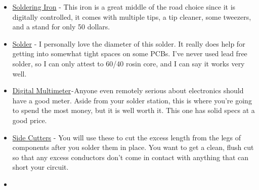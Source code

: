 \documentclass{article}
\begin{document}
\begin{itemize}
	\item \href{https://www.amazon.com/YIHUA-Professional-Digital-Soldering-Station/dp/B07RVMZNYR/ref=sr_1_1_sspa?dchild=1&keywords=soldering+station&qid=1602365482&s=hi&sr=1-1-spons&psc=1&spLa=ZW5jcnlwdGVkUXVhbGlmaWVyPUEzM1c4QjVDR1pQUENZJmVuY3J5cHRlZElkPUEwOTY0MDMwMlVINUhNMEJJTEhWWCZlbmNyeXB0ZWRBZElkPUEwMTM4Mjg4VDVCSzROUENLUDVMJndpZGdldE5hbWU9c3BfYXRmJmFjdGlvbj1jbGlja1JlZGlyZWN0JmRvTm90TG9nQ2xpY2s9dHJ1ZQ==}{Soldering Iron} - This iron is a great middle of the road choice since it is digitally controlled, it comes with multiple tips, a tip cleaner, some tweezers, and a stand for only 50 dollars.
	\item \href{https://www.amazon.com/Rosin-Core-Solder-8-0-oz/dp/B001D8X654/ref=sr_1_2?dchild=1&keywords=60%2F40+rosin+core+solder+.032%22&qid=1602425159&s=hi&sr=1-2}{Solder} - I personally love the diameter of this solder. It really does help for getting into somewhat tight spaces on some PCBs. I've never used lead free solder, so I can only attest to 60/40 rosin core, and I can say it works very well.
	\item \href{https://www.amazon.com/AstroAI-Multimeter-Resistance-Transistors-Temperature/dp/B071JL6LLL/ref=sr_1_1_sspa?crid=2363WGJIIOQRP&dchild=1&keywords=digital+multimeter&qid=1596927870&sprefix=digital+must%2Caps%2C140&sr=8-1-spons&psc=1&spLa=ZW5jcnlwdGVkUXVhbGlmaWVyPUE4N1YxVjBMT05SMEYmZW5jcnlwdGVkSWQ9QTA1ODA5NDkxQjNPTUk2QlFTU0U3JmVuY3J5cHRlZEFkSWQ9QTA4NTc1MjcyQTI1WlBJSkNEUVVZJndpZGdldE5hbWU9c3BfYXRmJmFjdGlvbj1jbGlja1JlZGlyZWN0JmRvTm90TG9nQ2xpY2s9dHJ1ZQ==}{Digital Multimeter} - Anyone even remotely serious about electronics should have a good meter. Aside from your solder station, this is where you're going to spend the most money, but it is well worth it. This one has solid specs at a good price.
	\item \href{https://www.amazon.com/Kaisi-Internal-Precision-Cutters-Cutting/dp/B0768SB2SP/ref=sr_1_2_sspa?dchild=1&keywords=side+cutters&qid=1602425617&sr=8-2-spons&psc=1&spLa=ZW5jcnlwdGVkUXVhbGlmaWVyPUEyOUg1S1M3UzhGTzlVJmVuY3J5cHRlZElkPUEwOTU3NDQyMVRJOUFXVEk3WVJXRCZlbmNyeXB0ZWRBZElkPUEwMTI2OTM4MTFXOVNMVkpNRDlIUCZ3aWRnZXROYW1lPXNwX2F0ZiZhY3Rpb249Y2xpY2tSZWRpcmVjdCZkb05vdExvZ0NsaWNrPXRydWU=}{Side Cutters} - You will use these to cut the excess length from the legs of components after you solder them in place. You want to get a clean, flush cut so that any excess conductors don't come in contact with anything that can short your circuit.
	\item

\end{itemize}
\end{document}
